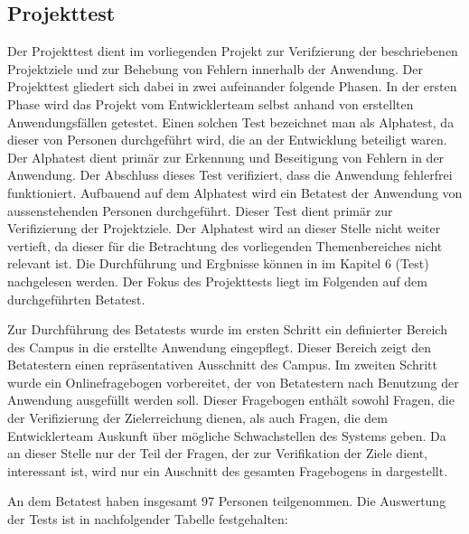 \subsection{Projekttest}
\label{sec:Projekttest}

Der Projekttest dient im vorliegenden Projekt zur Verifzierung der beschriebenen
Projektziele und zur Behebung von Fehlern innerhalb der Anwendung. Der
Projekttest gliedert sich dabei in zwei aufeinander folgende Phasen. In der
ersten Phase wird das Projekt vom Entwicklerteam selbst anhand von erstellten
Anwendungsfällen getestet. Einen solchen Test bezeichnet man als Alphatest, da
dieser von Personen durchgeführt wird, die an der Entwicklung beteiligt waren.
Der Alphatest dient primär zur Erkennung und Beseitigung von Fehlern in der
Anwendung. Der Abschluss dieses Test verifiziert, dass die Anwendung fehlerfrei
funktioniert. Aufbauend auf dem Alphatest wird ein Betatest der Anwendung von
aussenstehenden Personen durchgeführt. Dieser Test dient primär zur
Verifizierung der Projektziele. Der Alphatest wird an dieser Stelle nicht weiter
vertieft, da dieser für die Betrachtung des vorliegenden Themenbereiches nicht
relevant ist. Die Durchführung und Ergbnisse können in
\citet{modelierungUndBetrieb2014} im Kapitel 6 (Test) nachgelesen werden. Der
Fokus des Projekttests liegt im Folgenden auf dem durchgeführten Betatest.

Zur Durchführung des Betatests wurde im ersten Schritt ein definierter Bereich
des Campus in die erstellte Anwendung eingepflegt. Dieser Bereich zeigt den
Betatestern einen repräsentativen Ausschnitt des Campus.
Im zweiten Schritt wurde ein Onlinefragebogen vorbereitet, der von Betatestern
nach Benutzung der Anwendung ausgefüllt werden soll. Dieser Fragebogen enthält 
sowohl Fragen, die der Verifizierung der Zielerreichung dienen, als auch
Fragen, die dem Entwicklerteam Auskunft über mögliche Schwachstellen des Systems geben.
Da an dieser Stelle nur der Teil der Fragen, der zur Verifikation der Ziele dient,
interessant ist, wird nur ein Auschnitt des gesamten Fragebogens in dargestellt.

An dem Betatest haben insgesamt 97 Personen teilgenommen. Die Auswertung der Tests ist in nachfolgender Tabelle
festgehalten:

